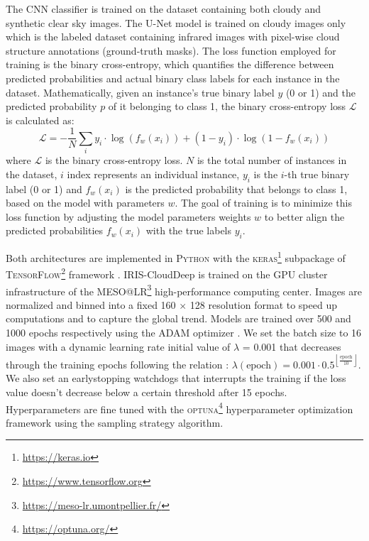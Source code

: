 \documentclass[amt, article]{copernicus}
\begin{document}
The CNN classifier is trained on the dataset containing both cloudy and synthetic clear sky images. The U-Net model is trained on cloudy images only which is the labeled dataset containing infrared images with pixel-wise cloud structure annotations (ground-truth masks). The loss function employed for training is the binary cross-entropy, which quantifies the difference between predicted probabilities and actual binary class labels for each instance in the dataset. Mathematically, given an instance's true binary label $y$ (0 or 1) and the predicted probability $p$ of it belonging to class 1, the binary cross-entropy loss $\mathcal{L}$ is calculated as:
\begin{equation}
	\mathcal{L} = -\frac{1}{N}\sum_i y_i\cdot\log\left(f_w(x_i)\right) + (1-y_i)\cdot\log\left(1-f_w(x_i)\right)
\end{equation}
where $\mathcal{L}$ is the binary cross-entropy loss. $N$ is the total number of instances in the dataset, $i$ index represents an individual instance, $y_{i}$ is the $i$-th true binary label (0 or 1) and $f_w(x_i)$ is the predicted probability that belongs to class 1, based on the model with parameters $w$. The goal of training is to minimize this loss function by adjusting the model parameters weights $w$ to better align the predicted probabilities $f_w(x_i)$ with the true labels $y_{i}$.

Both architectures are implemented in \textsc{Python} with the \textsc{keras}\footnote{\url{https://keras.io}} \citep{Keras} subpackage of \textsc{TensorFlow}\footnote{\url{https://www.tensorflow.org}} framework \citep{TensorFlow}. IRIS-CloudDeep is trained on the GPU cluster infrastructure of the MESO@LR\footnote{\url{https://meso-lr.umontpellier.fr/}} high-performance computing center. Images are normalized and binned into a fixed 160 $\times$ 128 resolution format to speed up computations and to capture the global trend. Models are trained over 500 and 1000 epochs respectively using the ADAM optimizer \citep{ADAM}. We set the batch size to 16 images with a dynamic learning rate initial value of $\lambda$ = 0.001 that decreases through the training epochs following the relation : $\lambda(\text{epoch}) = 0.001 \cdot 0.5^{\left\lfloor \frac{\text{epoch}}{10} \right\rfloor}
$. We also set an earlystopping watchdogs that interrupts the training if the loss value doesn't decrease below a certain threshold after 15 epochs.  Hyperparameters are fine tuned with the \textsc{optuna}\footnote{\url{https://optuna.org/}} hyperparameter optimization framework \citep{Optuna} using the sampling strategy algorithm.
\end{document}
